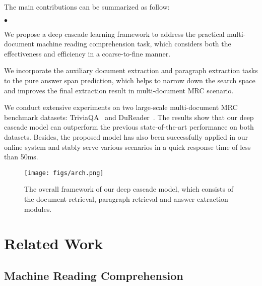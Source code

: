 \documentclass[letterpaper]{article} \usepackage{aaai19}  \usepackage{graphicx}
\newenvironment{myitemize2}[1][]{\begin{list}{$\bullet$}
    {
     \setlength{\leftmargin}{5mm}     \setlength{\parsep}{0.5mm}         \setlength{\topsep}{0mm}         \setlength{\itemsep}{0mm}        \setlength{\labelsep}{0.5em}     \setlength{\itemindent}{0mm}    \setlength{\listparindent}{6mm} }}
{\end{list}}
\begin{document}
The main contributions can be summarized as follow:
\begin{myitemize2}
	\item We propose a deep cascade learning framework to address the practical multi-document machine reading comprehension task,  which considers both the effectiveness and efficiency in a coarse-to-fine manner.
	\item We incorporate the auxiliary document extraction and paragraph extraction tasks to the pure answer span prediction, which helps to narrow down the search space and improves the final extraction result in multi-document MRC scenario.
	\item We conduct extensive experiments on two large-scale multi-document MRC benchmark datasets: TriviaQA~\cite{joshi2017triviaqa} and DuReader~\cite{he2017dureader}. The results show that our deep cascade model can outperform the previous state-of-the-art performance on both datasets. Besides,  the proposed model has also been successfully applied in our online system and stably serve various scenarios in a quick response time of less than 50ms.
\end{myitemize2}



\begin{figure}
\centering
\texttt{[image: figs/arch.png]}\vspace{-2mm}
\caption{The overall framework of our deep cascade model, which consists of the document retrieval, paragraph retrieval and answer extraction modules.} \vspace{-3mm}
\label{fig:arch}
\end{figure}

\section{Related Work}

\subsection{Machine Reading Comprehension}
\end{document}
